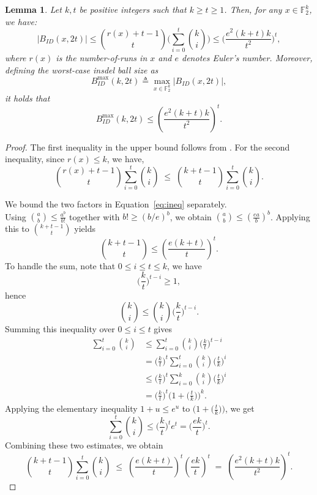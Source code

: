 \documentclass[11 pt]{article}
\numberwithin{equation}{section}
\newtheorem{lemma}[theorem]{Lemma}
\begin{document}
    \begin{lemma}\label{insdel_ball}
        Let $k, t$ be positive integers such that $k \ge t \ge 1$. Then, for any $x\in \mathbb{F}_2^k$, we have:
        $$ |B_{ID}(x, 2t)| \le \binom{r(x) + t - 1}{t}\Bigg( \sum_{i = 0}^{t}\binom{k}{i}\Bigg) \leq \Bigg(\frac{e^2(k+t)k}{t^2}\Bigg)^t,$$
        where $r(x)$ is the number-of-runs in $x$ and $e$ denotes Euler's number.
        Moreover, defining the worst-case insdel ball size as
        \[
        B^{\max}_{ID}(k,2t)
        \triangleq
        \max_{x \in \mathbb{F}_2^k} |B_{ID}(x,2t)|,
        \]
        it holds that
        \[
        B^{\max}_{ID}(k,2t)
        \le
        \left(\frac{e^2 (k+t)k}{t^2}\right)^t.
        \]
    \end{lemma}   
    \begin{proof}
        The first inequality in the upper bound follows from \cite[Theorem 4]{sala2013counting}. 
        For the second inequality, since $r(x)\le k$, we have,
        \begin{equation}
        \label{eq:ineq}
            \binom{r(x)+t-1}{t}\sum_{i=0}^{t}\binom{k}{i}
        \;\le\;
        \binom{k+t-1}{t}\sum_{i=0}^{t}\binom{k}{i}.
        \end{equation}

        \noindent
        We bound the two factors in Equation~\ref{eq:ineq} separately.\\
        Using $\binom{a}{b} \le \frac{a^b}{b!}$ together with $b! \ge (b/e)^b$, we obtain $\binom{a}{b} \le \left(\frac{ea}{b}\right)^b$. Applying this to $\binom{k+t-1}{t}$ yields 
        $$\binom{k+t-1}{t} \le \left(\frac{e(k+t)}{t}\right)^t.$$
        To handle the sum, note that $0 \leq i \leq t\leq k$, we have
        \[
            \Big(\frac{k}{t}\Big)^{t-i} \geq 1, 
        \]
        hence
        \[
            \binom{k}{i} \leq \binom{k}{i}\Big(\frac{k}{t}\Big)^{t-i}.
        \]
        Summing this inequality over $0\leq i\leq t$ gives
        \begin{align*}
           \sum_{i=0}^t\binom{k}{i} & \leq \sum_{i=0}^t \binom{k}{i}\Big(\frac{k}{t}\Big)^{t-i}\\
                                              & = \Big(\frac{k}{t}\Big)^{t} \sum_{i=0}^t \binom{k}{i} \Big(\frac{t}{k}\Big)^i \\
                                              & \leq \Big(\frac{k}{t}\Big)^{t} \sum_{i=0}^k \binom{k}{i}\Big(\frac{t}{k}\Big)^i \\
                                              & = \Big(\frac{k}{t}\Big)^{t} \Big( 1+\Big(\frac{t}{k}\Big)\Big)^k.
        \end{align*}
        Applying the elementary inequality $1 + u \leq e^u$ to $\Big(1+\Big(\frac{t}{k}\Big)\Big)$, we get
        \[
            \sum_{i=0}^t\binom{k}{i}  \leq  \Big(\frac{k}{t}\Big)^{t} e^t = \Big(\frac{ek}{t}\Big)^{t}.
        \]
        \noindent
        Combining these two estimates, we obtain
        \[
        \binom{k+t-1}{t}\sum_{i=0}^{t}\binom{k}{i}
        \;\le\;
        \left(\frac{e(k+t)}{t}\right)^t
        \left(\frac{ek}{t}\right)^t
        \;=\;
        \left(\frac{e^2 (k+t)k}{t^2}\right)^t.
        \] 
    \end{proof}
    
\end{document}
